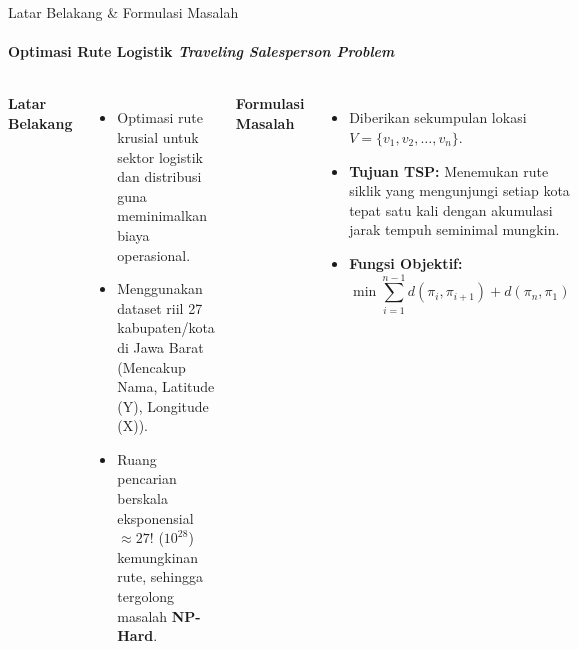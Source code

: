 \documentclass[aspectratio=169,10pt]{beamer}
\begin{document}
\begin{frame}{Latar Belakang \& Formulasi Masalah}
  \framesubtitle{Optimasi Rute Logistik \textit{Traveling Salesperson Problem}}
  \begin{columns}[T]
    \textbf{Latar Belakang}
    \begin{itemize}
      \item Optimasi rute krusial untuk sektor logistik dan distribusi guna meminimalkan biaya operasional.
      \item Menggunakan dataset riil 27 kabupaten/kota di Jawa Barat (Mencakup Nama, Latitude (Y), Longitude (X)).
      \item Ruang pencarian berskala eksponensial $\approx 27!$ ($10^{28}$) kemungkinan rute, sehingga tergolong masalah \textbf{NP-Hard}.
    \end{itemize}

    \textbf{Formulasi Masalah}
    \begin{itemize}
      \item Diberikan sekumpulan lokasi $V=\{v_1,v_2,\dots,v_n\}$.
      \item \textbf{Tujuan TSP:} Menemukan rute siklik yang mengunjungi setiap kota tepat satu kali dengan akumulasi jarak tempuh seminimal mungkin.
      \item \textbf{Fungsi Objektif:}
      \[
        \min \sum_{i=1}^{n-1} d(\pi_i,\pi_{i+1})+d(\pi_n,\pi_1)
      \]
    \end{itemize}
  \end{columns}
\end{frame}
\end{document}
